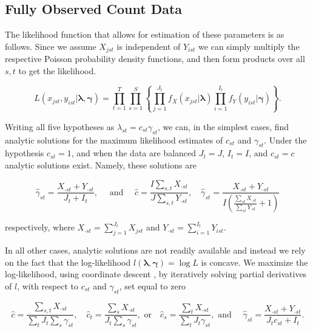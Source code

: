 \subsection{Fully Observed Count Data}

The likelihood function that allows for estimation of these parameters is as follows.  Since we assume $X_{jst}$ is independent of $Y_{ist}$ we can simply multiply the respective Poisson probability density functions, and then form products over all $s,t$ to get the likelihood.  

\begin{equation}
  \label{eq:likelihood}
  L(x_{jst}, y_{ist} |\boldsymbol{\lambda}, \boldsymbol{\gamma}) = \prod_{t = 1}^{T} \prod_{s=1}^S \left\{ \prod_{j=1}^{J_t} f_X(x_{jst}|\boldsymbol{\lambda}) \prod_{i=1}^{I_t} f_Y(y_{ist} | \boldsymbol{\gamma}) \right\}.
\end{equation}

\noindent Writing all five hypotheses as $\lambda_{st} = c_{st}\gamma_{st}$, we can, in the simplest cases, find analytic solutions for the maximum likelihood estimates of $c_{st}$ and $\gamma_{st}$.  Under the hypothesis $c_{st} = 1$, and when the data are balanced $J_t = J$, $I_t = I$, and $c_{st} = c$ analytic solutions exist.  Namely, these solutions are

\begin{equation*}
  \hat{\gamma}_{st} = \frac{X_{\cdot st} + Y_{\cdot st}}{J_t + I_t}, \quad \text{ and } \quad \hat{c} = \frac{I \sum_{s,t} X_{\cdot st}}{J \sum_{s,t} Y_{\cdot st}}, \quad \hat{\gamma}_{st} = \frac{X_{\cdot st} + Y_{\cdot st}}{I \left( \frac{\sum_{st} X_{\cdot st}}{\sum_{st} Y_{\cdot st}} + 1 \right)}
\end{equation*}

\noindent respectively, where $X_{\cdot st} = \sum_{j=1}^{J_t}X_{jst}$ and $Y_{\cdot st} = \sum_{i=1}^{I_t} Y_{ist}$.

In all other cases, analytic solutions are not readily available and instead we rely on the fact that the log-likelihood $l(\boldsymbol{\lambda}, \boldsymbol{\gamma}) = \log{L}$ is concave.  We maximize the log-likelihood, using coordinate descent \citep{Luo:1992}, by iteratively solving partial derivatives of $l$, with respect to $c_{st}$ and $\gamma_{st}$, set equal to zero

\begin{equation*}
  \hat{c} = \frac{\sum_{s,t} X_{\cdot st}}{\sum_t J_t \sum_s \gamma_{st}}, \quad \hat{c}_t =  \frac{\sum_s X_{\cdot st}}{J_t \sum_s \gamma_{st}}, \text{ or} \quad \hat{c}_s = \frac{\sum_{t}X_{\cdot st}}{\sum_t J_t \gamma_{st}}, \text{ and } \quad \hat{\gamma}_{st} = \frac{X_{\cdot st} + Y_{\cdot st}}{J_t c_{st} + I_t}.
\end{equation*}

